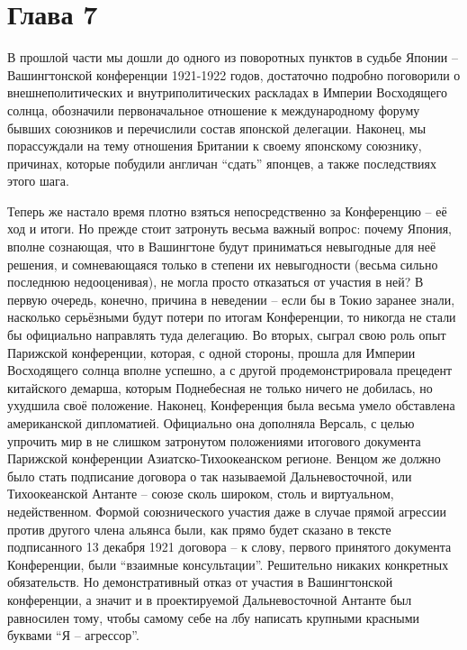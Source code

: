 \chapter{Глава 7}

В прошлой части мы дошли до одного из поворотных пунктов в судьбе Японии – Вашингтонской конференции 1921-1922 годов, достаточно подробно поговорили о внешнеполитических и внутриполитических раскладах в Империи Восходящего солнца, обозначили первоначальное отношение к международному форуму бывших союзников и перечислили состав японской делегации. Наконец, мы порассуждали на тему отношения Британии к своему японскому союзнику, причинах, которые побудили англичан “сдать” японцев, а также последствиях этого шага.

Теперь же настало время плотно взяться непосредственно за Конференцию – её ход и итоги. Но прежде стоит затронуть весьма важный вопрос: почему Япония, вполне сознающая, что в Вашингтоне будут приниматься невыгодные для неё решения, и сомневающаяся только в степени их невыгодности (весьма сильно последнюю недооценивая), не могла просто отказаться от участия в ней? В первую очередь, конечно, причина в неведении – если бы в Токио заранее знали, насколько серьёзными будут потери по итогам Конференции, то никогда не стали бы официально направлять туда делегацию. Во вторых, сыграл свою роль опыт Парижской конференции, которая, с одной стороны, прошла для Империи Восходящего солнца вполне успешно, а с другой продемонстрировала прецедент китайского демарша, которым Поднебесная не только ничего не добилась, но ухудшила своё положение. Наконец, Конференция была весьма умело обставлена американской дипломатией. Официально она дополняла Версаль, с целью упрочить мир в не слишком затронутом положениями итогового документа Парижской конференции Азиатско-Тихоокеанском регионе. Венцом же должно было стать подписание договора о так называемой Дальневосточной, или Тихоокеанской Антанте – союзе сколь широком, столь и виртуальном, недейственном. Формой союзнического участия даже в случае прямой агрессии против другого члена альянса были, как прямо будет сказано в тексте подписанного 13 декабря 1921 договора – к слову, первого принятого документа Конференции, были “взаимные консультации”. Решительно никаких конкретных обязательств. Но демонстративный отказ от участия в Вашингтонской конференции, а значит и в проектируемой Дальневосточной Антанте был равносилен тому, чтобы самому себе на лбу написать крупными красными буквами “Я – агрессор”.

